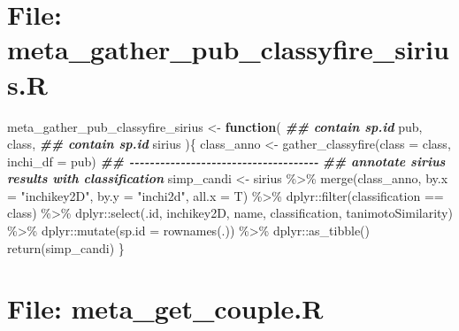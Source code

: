 \documentclass[
]{article}
\newenvironment{Shaded}{\begin{snugshade}}{\end{snugshade}}
\newcommand{\AttributeTok}[1]{\textcolor[rgb]{0.77,0.63,0.00}{#1}}
\newcommand{\ControlFlowTok}[1]{\textcolor[rgb]{0.13,0.29,0.53}{\textbf{#1}}}
\newcommand{\DocumentationTok}[1]{\textcolor[rgb]{0.56,0.35,0.01}{\textbf{\textit{#1}}}}
\newcommand{\FunctionTok}[1]{\textcolor[rgb]{0.00,0.00,0.00}{#1}}
\newcommand{\NormalTok}[1]{#1}
\newcommand{\OtherTok}[1]{\textcolor[rgb]{0.56,0.35,0.01}{#1}}
\newcommand{\SpecialCharTok}[1]{\textcolor[rgb]{0.00,0.00,0.00}{#1}}
\newcommand{\StringTok}[1]{\textcolor[rgb]{0.31,0.60,0.02}{#1}}
\begin{document}
\hypertarget{file-meta_gather_pub_classyfire_sirius.r}{%
\section{File: meta\_gather\_pub\_classyfire\_sirius.R}\label{file-meta_gather_pub_classyfire_sirius.r}}

\begin{Shaded}
\begin{Highlighting}[]
\NormalTok{meta\_gather\_pub\_classyfire\_sirius }\OtherTok{\textless{}{-}} 
  \ControlFlowTok{function}\NormalTok{(}
           \DocumentationTok{\#\# contain sp.id}
\NormalTok{           pub,}
\NormalTok{           class,}
           \DocumentationTok{\#\# contain sp.id}
\NormalTok{           sirius}
\NormalTok{           )\{}
\NormalTok{    class\_anno }\OtherTok{\textless{}{-}} \FunctionTok{gather\_classyfire}\NormalTok{(}\AttributeTok{class =}\NormalTok{ class, }\AttributeTok{inchi\_df =}\NormalTok{ pub)}
    \DocumentationTok{\#\# {-}{-}{-}{-}{-}{-}{-}{-}{-}{-}{-}{-}{-}{-}{-}{-}{-}{-}{-}{-}{-}{-}{-}{-}{-}{-}{-}{-}{-}{-}{-}{-}{-}{-}{-}{-}{-} }
    \DocumentationTok{\#\# annotate sirius results with classification}
\NormalTok{    simp\_candi }\OtherTok{\textless{}{-}}\NormalTok{ sirius }\SpecialCharTok{\%\textgreater{}\%} 
      \FunctionTok{merge}\NormalTok{(class\_anno, }\AttributeTok{by.x =} \StringTok{"inchikey2D"}\NormalTok{, }\AttributeTok{by.y =} \StringTok{"inchi2d"}\NormalTok{, }\AttributeTok{all.x =}\NormalTok{ T) }\SpecialCharTok{\%\textgreater{}\%} 
\NormalTok{      dplyr}\SpecialCharTok{::}\FunctionTok{filter}\NormalTok{(classification }\SpecialCharTok{==}\NormalTok{ class) }\SpecialCharTok{\%\textgreater{}\%} 
\NormalTok{      dplyr}\SpecialCharTok{::}\FunctionTok{select}\NormalTok{(.id, inchikey2D, name, classification, tanimotoSimilarity) }\SpecialCharTok{\%\textgreater{}\%} 
\NormalTok{      dplyr}\SpecialCharTok{::}\FunctionTok{mutate}\NormalTok{(}\AttributeTok{sp.id =} \FunctionTok{rownames}\NormalTok{(.)) }\SpecialCharTok{\%\textgreater{}\%} 
\NormalTok{      dplyr}\SpecialCharTok{::}\FunctionTok{as\_tibble}\NormalTok{()}
    \FunctionTok{return}\NormalTok{(simp\_candi)}
\NormalTok{  \}}
\end{Highlighting}
\end{Shaded}

\hypertarget{file-meta_get_couple.r}{%
\section{File: meta\_get\_couple.R}\label{file-meta_get_couple.r}}
\end{document}
